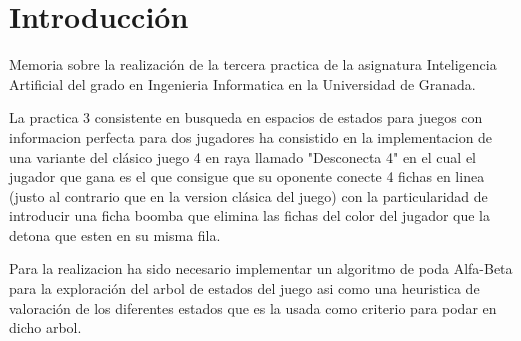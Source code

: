 \section{Introducción}
	Memoria sobre la realización de la tercera practica de la asignatura Inteligencia Artificial del grado en Ingenieria Informatica en la Universidad de Granada.

	La practica 3 consistente en busqueda en espacios de estados para juegos con informacion perfecta para dos jugadores ha consistido en la implementacion de una variante del clásico juego 4 en raya llamado "Desconecta 4" en el cual el jugador que gana es el que consigue que su oponente conecte 4 fichas en linea (justo al contrario que en la version clásica del juego) con la particularidad de introducir una ficha boomba que elimina las fichas del color del jugador que la detona que esten en su misma fila.

	Para la realizacion ha sido necesario implementar un algoritmo de poda Alfa-Beta para la exploración del arbol de estados del juego asi como una heuristica de valoración de los diferentes estados que es la usada como criterio para  podar en dicho arbol.
